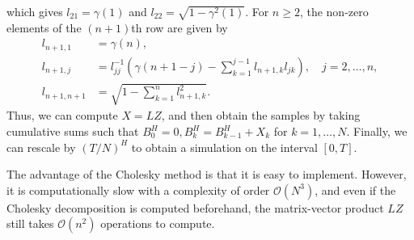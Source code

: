 which gives $l_{21}=\gamma(1)$ and $l_{22}=\sqrt{1-\gamma^{2}(1)}$. For $n\geq 2$, the non-zero elements of the $(n+1)$th row are given by
\begin{align*}
    l_{n+1,1}&=\gamma(n),\\
    l_{n+1,j}&=l_{jj}^{-1}\left(\gamma(n+1-j)-\sum_{k=1}^{j-1}l_{n+1,k}l_{jk}\right),\quad j=2,\dots,n,\\
    l_{n+1,n+1}&= \sqrt{1-\sum_{k=1}^{n}l_{n+1,k}^{2}}.
\end{align*}
Thus, we can compute $X=LZ$, and then obtain the samples by taking cumulative sums such that $B_{0}^{H}=0, B_{k}^{H}=B_{k-1}^{H}+X_{k}$ for $k=1,\dots,N$. Finally, we can rescale by $(T/N)^H$ to obtain a simulation on the interval $[0,T]$.

The advantage of the Cholesky method is that it is easy to implement. However, it is computationally slow with a complexity of order $\mathcal{O}(N^{3})$, and even if the Cholesky decomposition is computed beforehand, the matrix-vector product $LZ$ still takes $\mathcal{O}(n^2)$ operations to compute.
